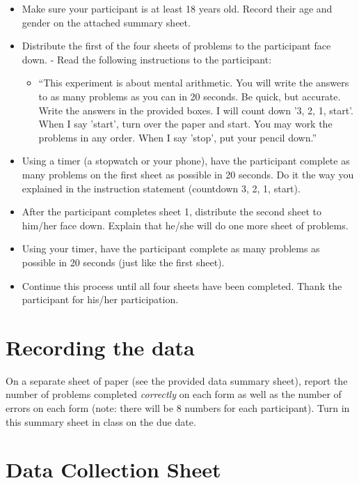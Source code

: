 \documentclass[11pt]{article}
\begin{document}
\begin{itemize}
\item Make sure your participant is at least 18 years old.  Record their age and gender on the attached summary sheet.
\item Distribute the first of the four sheets of problems to the participant face down.  - Read the following instructions to the participant:
\begin{itemize}
\item ``This experiment is about mental arithmetic.  You will write the answers to as many problems as you can in 20 seconds.  Be quick, but accurate.  Write the answers in the provided boxes.  I will count down '3, 2, 1, start'.  When I say 'start', turn over the paper and start.  You may work the problems in any order. When I say 'stop', put your pencil down.''
\end{itemize}

\item Using a timer (a stopwatch or your phone), have the participant complete as many problems on the first sheet as possible in 20 seconds.  Do it the way you explained in the instruction statement (countdown 3, 2, 1, start).

\item After the participant completes sheet 1, distribute the second sheet to him/her face down.  Explain that he/she will do one more sheet of problems.

\item Using your timer, have the participant complete as many problems as possible in 20 seconds (just like the first sheet).

\item Continue this process until all four sheets have been completed.  Thank the participant for his/her participation.
\end{itemize}

\section*{Recording the data}

On a separate sheet of paper (see the provided data summary sheet), report the number of problems completed \emph{correctly} on each form as well as the number of errors on each form (note: there will be 8 numbers for each participant).  Turn in this summary sheet in class on the due date.

\newpage 

\section*{Data Collection Sheet}
\end{document}
